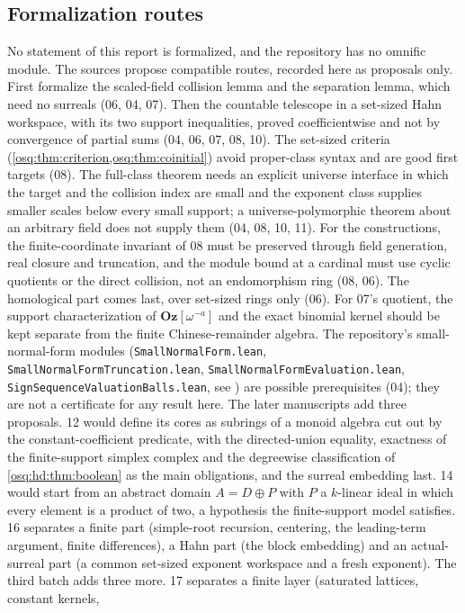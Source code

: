 \documentclass[11pt,letterpaper]{article}
\numberwithin{equation}{section}
\theoremstyle{definition}
\theoremstyle{remark}
\theoremstyle{plain}
\newcommand{\Oz}{\mathbf{Oz}}
\begin{document}
\subsection{Formalization routes}\label{osq:sub:formalization}
No statement of this report is formalized, and the repository has no omnific module. The sources
propose compatible routes, recorded here as proposals only. First formalize the scaled-field collision
lemma and the separation lemma, which need no surreals (06, 04, 07). Then the countable telescope in a
set-sized Hahn workspace, with its two support inequalities, proved coefficientwise and not by
convergence of partial sums (04, 06, 07, 08, 10). The set-sized criteria
(\cref{osq:thm:criterion,osq:thm:coinitial}) avoid proper-class syntax and are good first targets (08). The full-class theorem needs an explicit universe interface in which the target and the collision
index are small and the exponent class supplies smaller scales below every small support; a
universe-polymorphic theorem about an arbitrary field does not supply them (04, 08, 10, 11). For the
constructions, the finite-coordinate invariant of 08 must be preserved through field generation,
real closure and truncation, and the module bound at a cardinal must use cyclic quotients or the
direct collision, not an endomorphism ring (08, 06). The homological part comes last, over set-sized
rings only (06). For 07's quotient, the support characterization of $\Oz[\omega^{-a}]$ and the exact
binomial kernel should be kept separate from the finite Chinese-remainder algebra. The repository's
small-normal-form modules (\texttt{SmallNormalForm.lean}, \texttt{SmallNormalFormTruncation.lean},
\texttt{SmallNormalFormEvaluation.lean}, \texttt{SignSequenceValuationBalls.lean}, see
\cite{RepoBridge}) are possible prerequisites (04); they are not a certificate for any result here.
The later manuscripts add three proposals. 12 would define its cores as subrings of a monoid algebra cut out by the
constant-coefficient predicate, with the directed-union equality, exactness of the finite-support simplex complex and the
degreewise classification of \cref{osq:hd:thm:boolean} as the main obligations, and the surreal embedding last. 14 would
start from an abstract domain $A=D\oplus P$ with $P$ a $k$-linear ideal in which every element is a product of two, a
hypothesis the finite-support model satisfies. 16 separates a finite part (simple-root recursion, centering, the leading-term
argument, finite differences), a Hahn part (the block embedding) and an actual-surreal part (a common set-sized exponent
workspace and a fresh exponent). The third batch adds three more. 17 separates a finite layer (saturated lattices, constant kernels,
\end{document}
